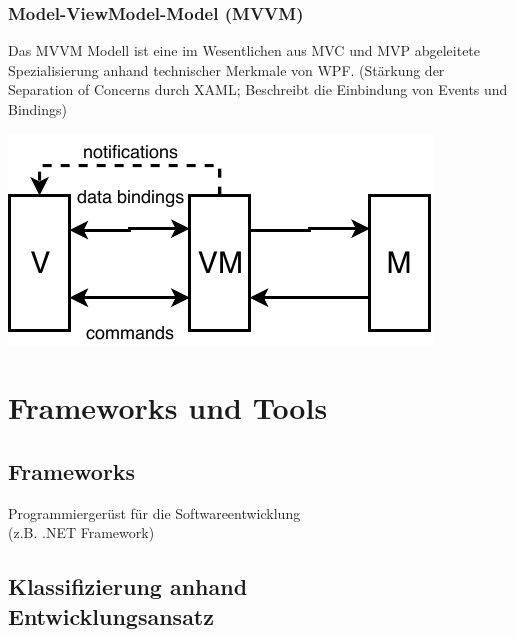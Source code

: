 \documentclass
[
	8pt,		%
	ngerman,	%
	a4paper,	%
	landscape,	%
	final		%
]{extarticle}
\begin{document}
\begin{multicols*}{4}
	\subsubsection{Model-ViewModel-Model (MVVM)}
	Das MVVM Modell ist eine im Wesentlichen aus MVC und MVP abgeleitete
	Spezialisierung anhand technischer Merkmale von WPF.
	(Stärkung der Separation of Concerns durch XAML; Beschreibt die Einbindung
	von Events und Bindings)
	\begin{center}
		\includegraphics[width=0.7\linewidth]{./pictures/mvvm.pdf}
	\end{center}
	\section{Frameworks und Tools}
	\subsection{Frameworks}
	Programmiergerüst für die Softwareentwicklung\\
	(z.B. .NET Framework)
	\subsection{Klassifizierung anhand\\Entwicklungsansatz}
	{
		\setlength{\columnseprule}{0pt}
		\begin{multicols*}{2}

\end{multicols*}}
\end{multicols*}
\end{document}
